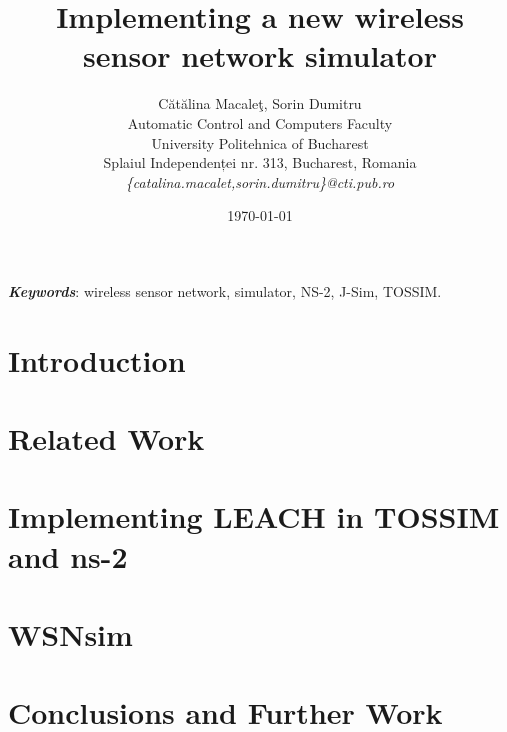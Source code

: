 \documentclass[12pt]{article}
\title{Implementing a new wireless sensor network simulator}
\author{C\u{a}t\u{a}lina Macale\c{t}, Sorin Dumitru\\
Automatic Control and Computers Faculty\\
University Politehnica of Bucharest\\
Splaiul Independenței nr. 313, Bucharest, Romania \\
\emph{\{catalina.macalet,sorin.dumitru\}@cti.pub.ro}}
\date{\today}
\newcommand{\codename}{WSNsim }
\begin{document}
\nocite{*}
\maketitle

\begin{abstract}

\end{abstract}

\textit{\textbf{Keywords}}: wireless sensor network, simulator, NS-2, J-Sim, TOSSIM.

\section{Introduction}
\label{sec:introduction}


\section{Related Work}
\label{sec:relatedwork}


\section{Implementing LEACH in TOSSIM and ns-2}
\label{sec:tests}


\section{\codename}
\label{sec:simulator}


\section{Conclusions and Further Work}
\label{sec:conclusion}

\newpage


\end{document}
